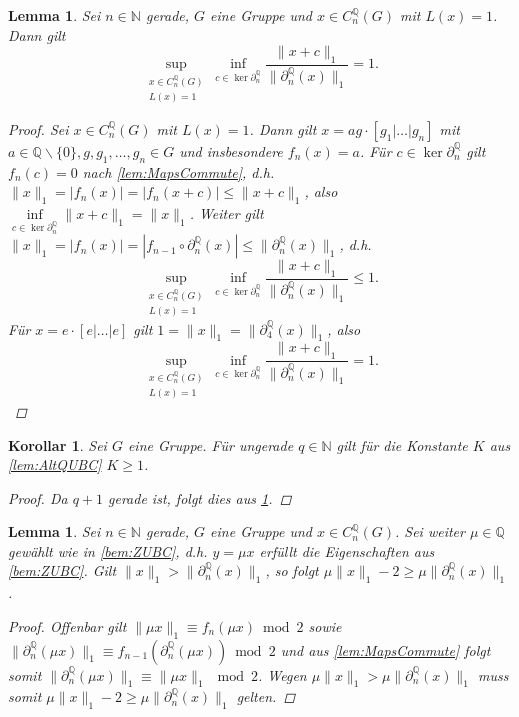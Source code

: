 \documentclass[a4paper,twoside,10pt]{scrreprt}
\newcommand{\N}{\mathbb{N}}
\newcommand{\Q}{\mathbb{Q}}
\newtheorem{lemma}[satz]{Lemma}
\newtheorem{korollar}[satz]{Korollar}
\theoremstyle{definition}
\begin{document}
\begin{lemma}\label{lem:KBiggerThan1}
Sei $n\in\N$ gerade, $G$ eine Gruppe und $x\in C_n^{\Q}(G)$ mit $L(x)=1$. Dann gilt 
\begin{equation*}
\sup\limits_{\substack{x\in C_n^{\Q}(G)\\L(x)=1}}\inf\limits_{c\in\ker\partial_n^{\Q}}\frac{\|x+c\|_1}{\|\partial_n^{\Q}(x)\|_1}=1.
\end{equation*}
\begin{proof}
Sei $x\in C_n^{\Q}(G)$ mit $L(x)=1$. Dann gilt $x=ag\cdot[g_1|\ldots|g_n]$ mit $a\in \Q\backslash\{0\},g,g_1,\ldots,g_n\in G$ und insbesondere $f_n(x)=a$. Für $c\in\ker\partial_n^{\Q}$ gilt $f_n(c)=0$ nach \cref{lem:MapsCommute}, d.h. $\|x\|_1=|f_n(x)|=|f_n(x+c)|\leq \|x+c\|_1$, also $\inf\limits_{c\in\ker\partial_n^{\Q}}\|x+c\|_1=\|x\|_1$. Weiter gilt $\|x\|_1=|f_n(x)|=|f_{n-1}\circ\partial_n^{\Q}(x)|\leq \|\partial_n^{\Q}(x)\|_1$, d.h.
\begin{equation*}
\sup\limits_{\substack{x\in C_n^{\Q}(G)\\L(x)=1}}\inf\limits_{c\in\ker\partial_n^{\Q}}\frac{\|x+c\|_1}{\|\partial_n^{\Q}(x)\|_1}\leq 1.
\end{equation*} 
Für $x=e\cdot[e|\ldots|e]$ gilt $1=\|x\|_1=\|\partial_4^{\Q}(x)\|_1$, also 
\begin{equation*}
\sup\limits_{\substack{x\in C_n^{\Q}(G)\\L(x)=1}}\inf\limits_{c\in\ker\partial_n^{\Q}}\frac{\|x+c\|_1}{\|\partial_n^{\Q}(x)\|_1}=1.
\end{equation*} 
\end{proof}
\end{lemma}

\begin{korollar}
Sei $G$ eine Gruppe. Für ungerade $q\in\N$ gilt für die Konstante $K$ aus \cref{lem:AltQUBC} $K\geq 1$.
\begin{proof}
Da $q+1$ gerade ist, folgt dies aus \cref{lem:KBiggerThan1}.
\end{proof}
\end{korollar}

\begin{lemma}\label{lem:parityEstimate}
Sei $n\in\N$ gerade, $G$ eine Gruppe und $x\in C_n^{\Q}(G)$. Sei weiter $\mu\in\Q$ gewählt wie in \cref{bem:ZUBC}, d.h. $y=\mu x$ erfüllt die Eigenschaften aus \cref{bem:ZUBC}. Gilt $\|x\|_1>\|\partial_n^{\Q}(x)\|_1$, so folgt $\mu\|x\|_1-2\geq \mu\|\partial_n^{\Q}(x)\|_1$.
\begin{proof}
Offenbar gilt $\|\mu x\|_1\equiv f_n(\mu x)\bmod 2$ sowie $\|\partial_n^{\Q}(\mu x)\|_1\equiv f_{n-1}(\partial_n^{\Q}(\mu x))\bmod 2$ und aus \cref{lem:MapsCommute} folgt somit $\|\partial_n^{\Q}(\mu x)\|_1\equiv \|\mu x\|_1\mod 2$. Wegen $\mu\|x\|_1>\mu\|\partial_n^{\Q}(x)\|_1$ muss somit $\mu\|x\|_1-2\geq\mu\|\partial_n^{\Q}(x)\|_1$ gelten.
\end{proof}
\end{lemma}
\end{document}
